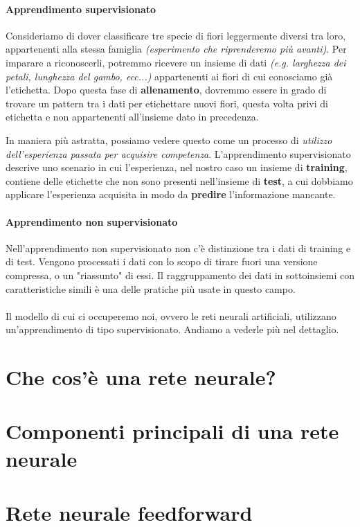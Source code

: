 \documentclass[12pt, twoside, letterpaper]{report}
\begin{document}
				\paragraph{Apprendimento supervisionato} Consideriamo di dover classificare tre specie di fiori leggermente diversi tra loro, appartenenti alla stessa famiglia \textit{(esperimento che riprenderemo più avanti)}. Per imparare a riconoscerli, potremmo ricevere un insieme di dati \textit{(e.g. larghezza dei petali, lunghezza del gambo, ecc...)} appartenenti ai fiori di cui conosciamo già l'etichetta. Dopo questa fase di \textbf{allenamento}, dovremmo essere in grado di trovare un pattern tra i dati per etichettare nuovi fiori, questa volta privi di etichetta e non appartenenti all'insieme dato in precedenza. 
				
					In maniera più astratta, possiamo vedere questo come un processo di \textit{utilizzo dell'esperienza passata per acquisire competenza}. L'apprendimento supervisionato descrive uno scenario in cui l'esperienza, nel nostro caso un insieme di \textbf{training}, contiene delle etichette che non sono presenti nell'insieme di \textbf{test}, a cui dobbiamo applicare l'esperienza acquisita in modo da \textbf{predire} l'informazione mancante.
				
				\paragraph{Apprendimento non supervisionato}  Nell'apprendimento non supervisionato non c'è distinzione tra i dati di training e di test. Vengono processati i dati con lo scopo di tirare fuori una versione compressa, o un "riassunto" di essi. Il raggruppamento dei dati in sottoinsiemi con caratteristiche simili è una delle pratiche più usate in questo campo.\\\\
				Il modello di cui ci occuperemo noi, ovvero le reti neurali artificiali, utilizzano un'apprendimento di tipo supervisionato. Andiamo a vederle più nel dettaglio.
			
		\section{Che cos'è una rete neurale?}
			
			
		\section{Componenti principali di una rete neurale}
		\section{Rete neurale feedforward}
\end{document}
